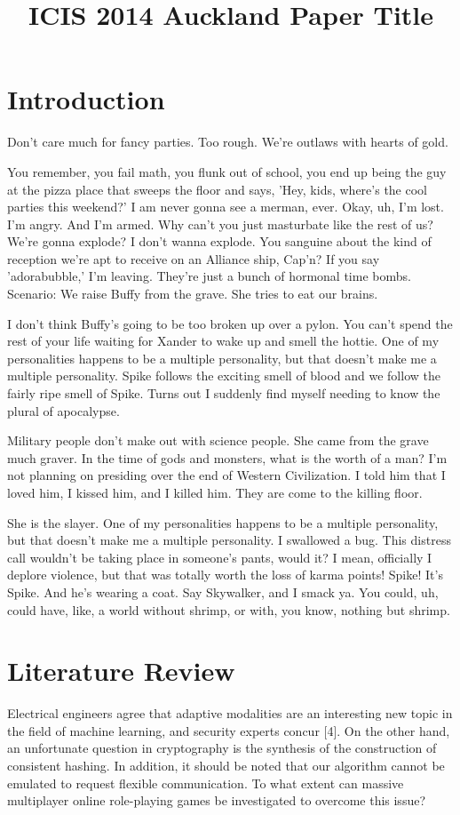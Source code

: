 \documentclass{icisdoc}
\title{ICIS 2014 Auckland Paper Title}
\begin{document}
\maketitle

\section{Introduction}
Don't care much for fancy parties. Too rough. We're outlaws with hearts of gold.

You remember, you fail math, you flunk out of school, you end up being the guy
at the pizza place that sweeps the floor and says, 'Hey, kids, where's the cool
parties this weekend?' I am never gonna see a merman, ever. Okay, uh, I'm
lost. I'm angry. And I'm armed. Why can't you just masturbate like the rest of
us? We're gonna explode? I don't wanna explode. You sanguine about the kind of
reception we're apt to receive on an Alliance ship, Cap'n? If you say
'adorabubble,' I'm leaving. They're just a bunch of hormonal time
bombs. Scenario: We raise Buffy from the grave. She tries to eat our brains.

I don't think Buffy's going to be too broken up over a pylon. You can't spend
the rest of your life waiting for Xander to wake up and smell the hottie. One of
my personalities happens to be a multiple personality, but that doesn't make me
a multiple personality. Spike follows the exciting smell of blood and we follow
the fairly ripe smell of Spike. Turns out I suddenly find myself needing to know
the plural of apocalypse.

Military people don't make out with science people. She came from the grave much
graver. In the time of gods and monsters, what is the worth of a man? I'm not
planning on presiding over the end of Western Civilization. I told him that I
loved him, I kissed him, and I killed him. They are come to the killing floor.

She is the slayer. One of my personalities happens to be a multiple personality,
but that doesn't make me a multiple personality. I swallowed a bug. This
distress call wouldn't be taking place in someone's pants, would it? I mean,
officially I deplore violence, but that was totally worth the loss of karma
points! Spike! It's Spike. And he's wearing a coat. Say Skywalker, and I smack
ya. You could, uh, could have, like, a world without shrimp, or with, you know,
nothing but shrimp.

\section{Literature Review}
Electrical engineers agree that adaptive modalities are an interesting new topic
in the field of machine learning, and security experts concur [4]. On the other
hand, an unfortunate question in cryptography is the synthesis of the
construction of consistent hashing. In addition, it should be noted that our
algorithm cannot be emulated to request flexible communication. To what extent
can massive multiplayer online role-playing games be investigated to overcome
this issue?
\end{document}
